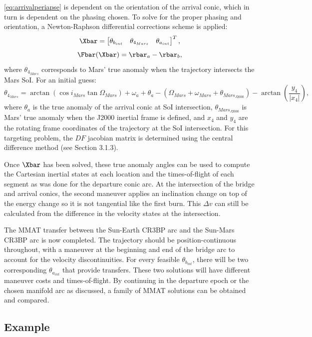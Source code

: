 \cref{eq:arrivalperiapse} is dependent on the orientation of the arrival conic, which in turn is
dependent on the phasing chosen. To solve for the proper phasing and orientation, a Newton-Raphson
differential corrections scheme is applied:
\begin{equation}
    \Xbar=\begin{bmatrix}   \theta_{b_{int}}    &   \theta_{4_{Mars}}   &   \theta_{a_{int}}    \end{bmatrix}^{T},
    \label{eq:MMATfreevar}
\end{equation}
\begin{equation}
    \Fbar(\Xbar)=\rbar_{a}-\rbar_{b},
    \label{eq:MMATconst}
\end{equation}
where $\theta_{4_{Mars}}$ corresponds to Mars' true anomaly when the trajectory intersects the Mars
SoI. For an initial guess:
\begin{equation}
    \theta_{4_{Mars}}=\arctan(\cos i_{Mars}\tan\Omega_{Mars})+\omega_{a}+\theta_{a}-(\Omega_{Mars}+\omega_{Mars}+\theta_{Mars_{J2000}})-\arctan(\frac{y_{4}}{|x_{4}|}),
    \label{eq:arrivalepoch}
\end{equation}
where $\theta_{a}$ is the true anomaly of the arrival conic at SoI intersection,
$\theta_{Mars_{J2000}}$ is Mars' true anomaly when the J2000 inertial frame is defined, and $x_{4}$
and $y_{4}$ are the rotating frame coordinates of the trajectory at the SoI intersection. For this
targeting problem, the $DF$ jacobian matrix is determined using the central difference method (see
Section 3.1.3).

Once $\Xbar$ has been solved, these true anomaly angles can be used to compute the Cartesian
inertial states at each location and the times-of-flight of each segment as was done for the
departure conic arc. At the intersection of the bridge and arrival conics, the second maneuver
applies an inclination change on top of the energy change so it is not tangential like the first
burn. This $\Delta v$ can still be calculated from the difference in the velocity states at the
intersection.

The MMAT transfer between the Sun-Earth CR3BP arc and the Sun-Mars CR3BP arc is now completed. The
trajectory should be position-continuous throughout, with a maneuver at the beginning and end of
the bridge arc to account for the velocity discontinuities. For every feasible $\theta_{b_{int}}$,
there will be two corresponding $\theta_{a_{int}}$ that provide transfers. These two solutions will
have different maneuver costs and times-of-flight. By continuing in the departure epoch or the
chosen manifold arc as discussed, a family of MMAT solutions can be obtained and compared.

\subsection{Example}

